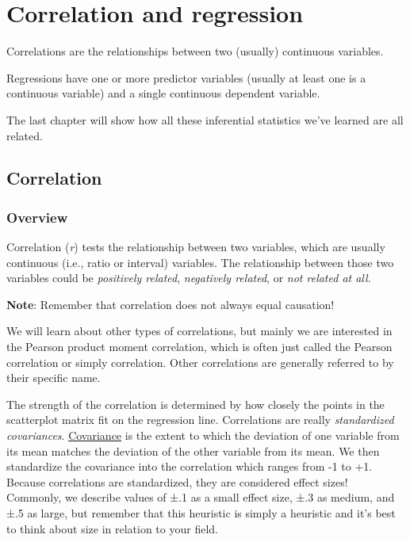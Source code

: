 \documentclass[
]{book}
\begin{document}
\hypertarget{correlation-and-regression}{%
\chapter{Correlation and regression}\label{correlation-and-regression}}

Correlations are the relationships between two (usually) continuous variables.

Regressions have one or more predictor variables (usually at least one is a continuous variable) and a single continuous dependent variable.

The last chapter will show how all these inferential statistics we've learned are all related.

\hypertarget{correlation}{%
\section{Correlation}\label{correlation}}

\hypertarget{overview-10}{%
\subsection{Overview}\label{overview-10}}

Correlation (\emph{r}) tests the relationship between two variables, which are usually continuous (i.e., ratio or interval) variables. The relationship between those two variables could be \emph{positively related}, \emph{negatively related}, or \emph{not related at all}.

\textbf{Note}: Remember that correlation does not always equal causation!

We will learn about other types of correlations, but mainly we are interested in the Pearson product moment correlation, which is often just called the Pearson correlation or simply correlation. Other correlations are generally referred to by their specific name.

The strength of the correlation is determined by how closely the points in the scatterplot matrix fit on the regression line. Correlations are really \emph{standardized covariances}. \underline{Covariance} is the extent to which the deviation of one variable from its mean matches the deviation of the other variable from its mean. We then standardize the covariance into the correlation which ranges from -1 to +1. Because correlations are standardized, they are considered effect sizes! Commonly, we describe values of ±.1 as a small effect size, ±.3 as medium, and ±.5 as large, but remember that this heuristic is simply a heuristic and it's best to think about size in relation to your field.
\end{document}
